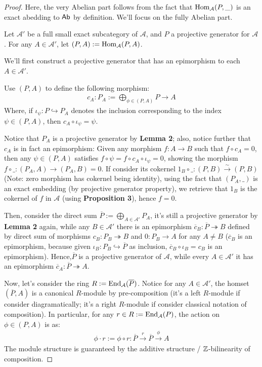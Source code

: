 \documentclass{article}
\begin{document}
\begin{proof}
    Here, the very Abelian part follows from the fact that $\mathrm{Hom}_\mathcal{A}(P,\_)$ is an exact abedding to $\mathsf{Ab}$ by definition. We'll focus on the fully Abelian part. 
    
    Let $\mathcal{A}'$ be a full small exact subcategory of $\mathcal{A}$, and $P$ a projective generator for $\mathcal{A}$. For any $A\in\mathcal{A}'$, let $(P,A):=\mathrm{Hom}_{\mathcal{A}}(P,A)$. 

    \hfil

    We'll first construct a projective generator that has an epimorphism to each $A\in\mathcal{A}'$.
    
    Use $(P,A)$ to define the following morphism:
    \begin{align}
        c_A:P_A :=\bigoplus_{\phi\in (P,A)}P \rightarrow A
    \end{align} 
    Where, if $\iota_\psi: P\hookrightarrow P_A$ denotes the inclusion corresponding to the index $\psi\in (P,A)$, then $c_A\circ \iota_\psi = \psi$. 
    
    Notice that $P_A$ is a projective generator by \textbf{Lemma 2}; also, notice further that $c_A$ is in fact an epimorphism: Given any morphism $f:A\rightarrow B$ such that $f\circ c_A = 0$, then any $\psi\in (P,A)$ satisfies $f\circ \psi = f\circ c_A\circ \iota_\psi = 0$, showing the morphism $f\circ\_:(P_A,A)\rightarrow(P_A,B) = 0$. If consider its cokernel $1_B\circ\_:(P,B)\xrightarrow{\sim}(P,B)$ (Note: zero morphism has cokernel being identity), using the fact that $(P_A,\_)$ is an exact embedding (by projective generator property), we retrieve that $1_B$ is the cokernel of $f$ in $\mathcal{A}$ (using \textbf{Proposition 3}), hence $f=0$.

    Then, consider the direct sum $\overline{P}:=\bigoplus_{A\in\mathcal{A}'}P_A$, it's still a projective generator by \textbf{Lemma 2} again, while any $B\in\mathcal{A}'$ there is an epimorphism $\overline{c}_B:\overline{P}\twoheadrightarrow B$ defined by direct sum of morphisms $c_B:P_B\twoheadrightarrow B$ and $0:P_B\rightarrow A$ for any $A\neq B$ ($\overline{c}_B$ is an epimorphism, because given $\iota_B:P_B\hookrightarrow \overline{P}$ as inclusion, $\overline{c}_B \circ \iota_B = c_B$ is an epimorphism). Hence,$\overline{P}$ is a projective generator of $\mathcal{A}$, while every $A\in\mathcal{A}'$ it has an epimorphism $\overline{c}_A:\overline{P}\twoheadrightarrow A$.

    \hfil

    Now, let's consider the ring $R := \mathrm{End}_\mathcal{A}(\overline{P})$. Notice for any $A\in\mathcal{A}'$, the homset $(\overline{P},A)$ is a canonical $R$-module by pre-composition (it's a left $R$-module if consider diagramatically; it's a right $R$-module if consider classical notation of composition). In particular, for any $r\in R:=\mathrm{End}_\mathcal{A}(P)$, the action on $\phi\in (P,A)$ is as:
    \begin{align}
        \phi\cdot r := \phi\circ r:\overline{P}\xrightarrow{r}\overline{P}\xrightarrow{\phi}A
    \end{align}
    The module structure is guaranteed by the additive structure / $\mathbb{Z}$-bilinearity of composition.
    

\end{proof}
\end{document}
